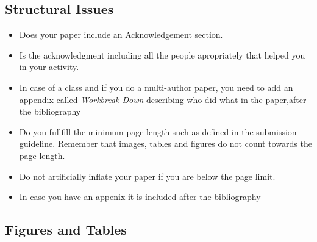 \subsection{Structural Issues}

\begin{itemize}[label=$\Box$]
    \item Does your paper include an Acknowledgement section.
    \item Is the acknowledgment including all the people apropriately
      that helped you in your activity. 
    \item In case of a class and if you do a multi-author paper, you
      need to add an appendix called \textit{Workbreak Down} describing
      who did what in the paper,after the bibliography
    \item Do you fullfill the minimum page length such as defined in
      the submission guideline. Remember that 
      images, tables and figures do not count towards the page length.
    \item Do not artificially inflate your paper if you are below the
      page limit.
    \item In case you have an appenix it is included after the
      bibliography
\end{itemize}

\subsection{Figures and Tables}

